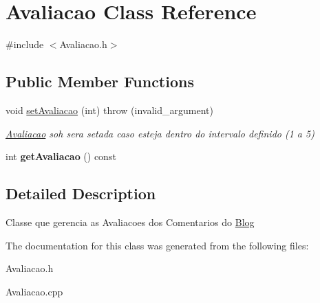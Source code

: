\hypertarget{classAvaliacao}{}\section{Avaliacao Class Reference}
\label{classAvaliacao}


{\ttfamily \#include $<$Avaliacao.\+h$>$}

\subsection*{Public Member Functions}
\begin{DoxyCompactItemize}
\item 
void \hyperlink{classAvaliacao_ab97579a2bbda3e35ca77fc25e28df09a}{set\+Avaliacao} (int)  throw (invalid\+\_\+argument)\hypertarget{classAvaliacao_ab97579a2bbda3e35ca77fc25e28df09a}{}\label{classAvaliacao_ab97579a2bbda3e35ca77fc25e28df09a}

\begin{DoxyCompactList}\small\item\em \hyperlink{classAvaliacao}{Avaliacao} soh sera setada caso esteja dentro do intervalo definido (1 a 5) \end{DoxyCompactList}\item 
int {\bfseries get\+Avaliacao} () const \hypertarget{classAvaliacao_afd34fbf979627b471c6235128a599b97}{}\label{classAvaliacao_afd34fbf979627b471c6235128a599b97}

\end{DoxyCompactItemize}


\subsection{Detailed Description}
Classe que gerencia as Avaliacoes dos Comentarios do \hyperlink{classBlog}{Blog} 

The documentation for this class was generated from the following files\+:\begin{DoxyCompactItemize}
\item 
Avaliacao.\+h\item 
Avaliacao.\+cpp\end{DoxyCompactItemize}
